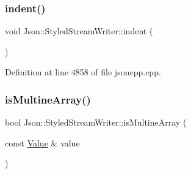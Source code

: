 \hypertarget{class_json_1_1_styled_stream_writer_ab49409578422aa73b060e3492dd6c72a}{}\label{class_json_1_1_styled_stream_writer_ab49409578422aa73b060e3492dd6c72a} 
\subsubsection{\texorpdfstring{indent()}{indent()}\hspace{0.1cm}{\footnotesize\ttfamily [2/2]}}
{\footnotesize\ttfamily void Json\+::\+Styled\+Stream\+Writer\+::indent (\begin{DoxyParamCaption}{ }\end{DoxyParamCaption})\hspace{0.3cm}{\ttfamily [private]}}



Definition at line 4858 of file jsoncpp.\+cpp.

\hypertarget{class_json_1_1_styled_stream_writer_a88f4d342cf25c73aabf77c1b8ba01e44}{}\label{class_json_1_1_styled_stream_writer_a88f4d342cf25c73aabf77c1b8ba01e44} 
\subsubsection{\texorpdfstring{is\+Multine\+Array()}{isMultineArray()}\hspace{0.1cm}{\footnotesize\ttfamily [1/2]}}
{\footnotesize\ttfamily bool Json\+::\+Styled\+Stream\+Writer\+::is\+Multine\+Array (\begin{DoxyParamCaption}\item[{const \hyperlink{class_json_1_1_value}{Value} \&}]{value }\end{DoxyParamCaption})\hspace{0.3cm}{\ttfamily [private]}}

\hypertarget{class_json_1_1_styled_stream_writer_a88f4d342cf25c73aabf77c1b8ba01e44}{}\label{class_json_1_1_styled_stream_writer_a88f4d342cf25c73aabf77c1b8ba01e44} 
